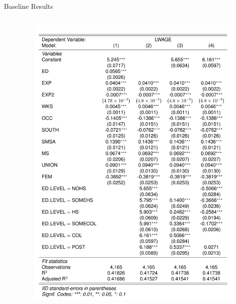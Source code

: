 \begin{frame}{Baseline Results}
\begin{columns}
\begin{column}{0.6\textwidth}
\end{column}
\begin{column}{0.4\textwidth}
\begin{figure}
\flushleft
	\includegraphics [width=\textwidth]	{table_1}
\end{figure}
\end{column}
\end{columns}	

\end{frame}


